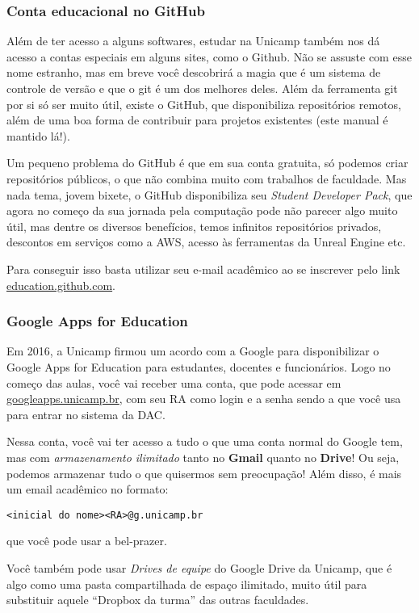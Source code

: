 \subsubsection{Conta educacional no GitHub}

Além de ter acesso a alguns softwares, estudar na Unicamp também nos dá acesso
a contas especiais em alguns sites, como o Github. Não se assuste com esse nome
estranho, mas em breve você descobrirá a magia que é um sistema de controle de
versão e que o git é um dos melhores deles. Além da ferramenta git por si só
ser muito útil, existe o GitHub, que disponibiliza repositórios remotos, além
de uma boa forma de contribuir para projetos existentes (este manual é mantido
lá!).

Um pequeno problema do GitHub é que em sua conta gratuita, só podemos criar
repositórios públicos, o que não combina muito com trabalhos de faculdade. Mas
nada tema, jovem bixete, o GitHub disponibiliza seu \emph{Student Developer
Pack}, que agora no começo da sua jornada pela computação pode não parecer algo
muito útil, mas dentre os diversos benefícios, temos infinitos repositórios
privados, descontos em serviços como a AWS, acesso às ferramentas da Unreal
Engine etc.

Para conseguir isso basta utilizar seu e-mail acadêmico ao se inscrever pelo
link \url{education.github.com}.

\subsubsection{Google Apps for Education}

Em 2016, a Unicamp firmou um acordo com a Google para disponibilizar o
Google Apps for Education para estudantes, docentes e funcionários. Logo no
começo das aulas, você vai receber uma conta, que pode acessar em
\url{googleapps.unicamp.br}, com seu RA como login e a senha sendo a que você
usa para entrar no sistema da DAC.

Nessa conta, você vai ter acesso a tudo o que uma conta normal do Google tem,
mas com \emph{armazenamento ilimitado} tanto no \textbf{Gmail} quanto no
\textbf{Drive}! Ou seja, podemos armazenar tudo o que quisermos sem
preocupação! Além disso, é mais um email acadêmico no formato:
\begin{center}
\texttt{<inicial do nome><RA>@g.unicamp.br}
\end{center}
que você pode usar a bel-prazer.

Você também pode usar \emph{Drives de equipe} do Google Drive da Unicamp, que é
algo como uma pasta compartilhada de espaço ilimitado, muito útil para
substituir aquele ``Dropbox da turma'' das outras faculdades.

